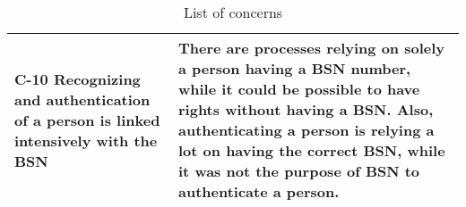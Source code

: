 \begin{table}
\begin{tabular}{ |p{5cm}||p{11cm}|}
\hline
C-10 Recognizing and authentication of a person is linked intensively with the BSN & There are processes relying on solely a person having a BSN number, while it could be possible to have rights without having a BSN. Also, authenticating a person is relying a lot on having the correct BSN, while it was not the purpose of BSN to authenticate a person.
 \\
\hline
\end{tabular}
\caption{List of concerns}
\label{table:3}
\end{table}




